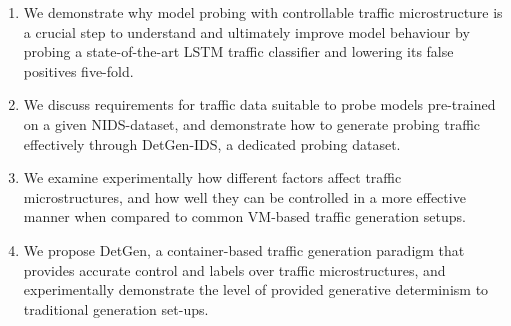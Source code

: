 \documentclass[runningheads]{llncs}
\begin{document}
\begin{enumerate}

\item We demonstrate why model probing with controllable traffic microstructure is a crucial step to understand and ultimately improve model behaviour by probing a state-of-the-art LSTM traffic classifier and lowering its false positives five-fold.


\item We discuss requirements for traffic data suitable to probe models pre-trained on a given NIDS-dataset, and demonstrate how to generate probing traffic effectively through DetGen-IDS, a dedicated probing dataset.

\item We examine experimentally how different factors affect traffic microstructures, and how well they can be controlled in a more effective manner when compared to common VM-based traffic generation setups.

\item We propose DetGen, a container-based traffic generation paradigm that provides accurate control and labels over traffic microstructures, and experimentally demonstrate the level of provided generative determinism to traditional generation set-ups.





\end{enumerate}
\end{document}
